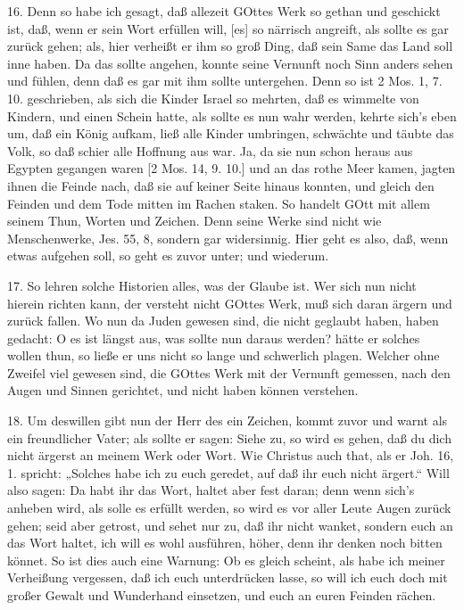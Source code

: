 16. Denn so habe ich gesagt, daß allezeit GOttes Werk so gethan und geschickt ist, daß, wenn er sein Wort erfüllen will, [es] so närrisch angreift, als sollte es gar zurück gehen; als, hier verheißt er ihm so groß Ding, daß sein Same das Land soll inne haben. Da das sollte angehen, konnte seine Vernunft noch Sinn anders sehen und fühlen, denn daß es gar mit ihm sollte untergehen. Denn so ist 2 Mos. 1, 7. 10. geschrieben, als sich die Kinder Israel so mehrten, daß es wimmelte von Kindern, und einen Schein hatte, als sollte es nun wahr werden, kehrte sich’s eben um, daß ein König aufkam, ließ alle Kinder umbringen, schwächte und täubte das Volk, so daß schier alle Hoffnung aus war. Ja, da sie nun schon heraus aus Egypten gegangen waren [2 Mos. 14, 9. 10.] und an das rothe Meer kamen, jagten ihnen die Feinde nach, daß sie auf keiner Seite hinaus konnten, und gleich den Feinden und dem Tode mitten im Rachen staken. So handelt GOtt mit allem seinem Thun, Worten und Zeichen. Denn seine Werke sind nicht wie Menschenwerke, Jes. 55, 8, sondern gar widersinnig. Hier geht es also, daß, wenn etwas aufgehen soll, so geht es zuvor unter; und wiederum.

17. So lehren solche Historien alles, was der Glaube ist. Wer sich nun nicht hierein richten kann, der versteht nicht GOttes Werk, muß sich daran ärgern und zurück fallen. Wo nun da Juden gewesen sind, die nicht geglaubt haben, haben gedacht: O es ist längst aus, was sollte nun daraus werden? hätte er solches wollen thun, so ließe er uns nicht so lange und schwerlich plagen. Welcher ohne Zweifel viel gewesen sind, die GOttes Werk mit der Vernunft gemessen, nach den Augen und Sinnen gerichtet, und nicht haben können verstehen.

18. Um deswillen gibt nun der Herr des ein Zeichen, kommt zuvor und warnt als ein freundlicher Vater; als sollte er sagen: Siehe zu, so wird es gehen, daß du dich nicht ärgerst an meinem Werk oder Wort. Wie Christus auch that, als er Joh. 16, 1. spricht: „Solches habe ich zu euch geredet, auf daß ihr euch nicht ärgert.“ Will also sagen: Da habt ihr das Wort, haltet aber fest daran; denn wenn sich’s anheben wird, als solle es erfüllt werden, so wird es vor aller Leute Augen zurück gehen; seid aber getrost, und sehet nur zu, daß ihr nicht wanket, sondern euch an das Wort haltet, ich will es wohl ausführen, höher, denn ihr denken noch bitten könnet. So ist dies auch eine Warnung: Ob es gleich scheint, als habe ich meiner Verheißung vergessen, daß ich euch unterdrücken lasse, so will ich euch doch mit großer Gewalt und Wunderhand einsetzen, und euch an euren Feinden rächen.

